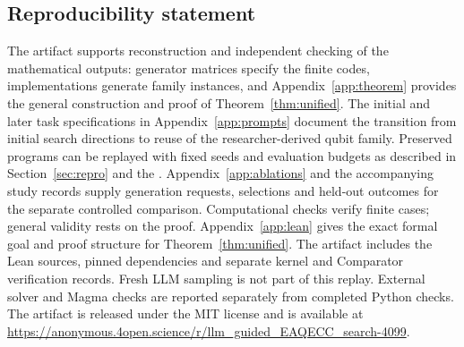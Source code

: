 \subsection*{Reproducibility statement}
The artifact supports reconstruction and independent checking of the
mathematical outputs: generator matrices specify the finite codes,
implementations generate family instances, and Appendix~\ref{app:theorem}
provides the general construction and proof of Theorem~\ref{thm:unified}.
The initial and later task specifications in Appendix~\ref{app:prompts}
document the transition from initial search directions to reuse of
the researcher-derived qubit family. Preserved programs can be replayed with fixed
seeds and evaluation budgets as described in Section~\ref{sec:repro}
and the \artifactlink{}. Appendix~\ref{app:ablations} and the accompanying
study records supply generation requests, selections and held-out
outcomes for the separate controlled comparison. Computational checks
verify finite cases; general validity rests on the proof.
Appendix~\ref{app:lean} gives the exact formal goal and proof structure
for Theorem~\ref{thm:unified}. The artifact includes the Lean sources,
pinned dependencies and separate kernel and Comparator verification records.
Fresh LLM sampling is not part of this replay. External solver
and Magma checks are reported separately from completed Python checks.
The artifact is released under the MIT license and is available at
\url{https://anonymous.4open.science/r/llm_guided_EAQECC_search-4099}.

